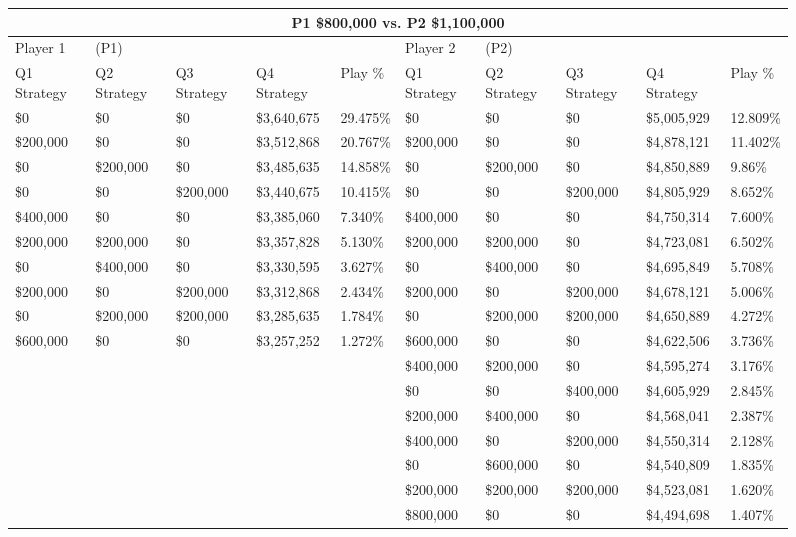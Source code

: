 \documentclass[11pt]{article}
\begin{document}
\begin{figure}
\tiny
\begin{tabular}{ |p{1.0cm}p{1.0cm}p{1.0cm}p{2.0cm}|p{1.0cm}||p{1.0cm}p{1.0cm}p{1.0cm}p{2.0cm}|p{1.0cm}|}
\hline
\multicolumn{10}{|c|}{P1 \$800,000 vs. P2 \$1,100,000} \\
\hline
Player 1 & (P1) & & & & Player 2 & (P2) & & & \\
\hline
Q1 Strategy & Q2 Strategy & Q3 Strategy & Q4 Strategy  &  Play \% & Q1 Strategy & Q2 Strategy & Q3 Strategy & Q4 Strategy  &  Play \%\\
\hline
\$0 & \$0 & \$0 & \$3,640,675 & 29.475\% & \$0 & \$0 & \$0 & \$5,005,929 & 12.809\% \\
\$200,000 & \$0 & \$0 & \$3,512,868 & 20.767\% & \$200,000 & \$0 & \$0 & \$4,878,121 & 11.402\% \\
\$0 & \$200,000 & \$0 & \$3,485,635 & 14.858\% & \$0 & \$200,000 & \$0 & \$4,850,889 & 9.86\% \\
\$0 & \$0 & \$200,000 & \$3,440,675 & 10.415\% & \$0 & \$0 & \$200,000 & \$4,805,929 & 8.652\% \\
\$400,000 & \$0 & \$0 & \$3,385,060 & 7.340\% & \$400,000 & \$0 & \$0 & \$4,750,314 & 7.600\% \\
\$200,000 & \$200,000 & \$0 & \$3,357,828 & 5.130\% & \$200,000 & \$200,000 & \$0 & \$4,723,081 & 6.502\% \\
\$0 & \$400,000 & \$0 & \$3,330,595 & 3.627\% & \$0 & \$400,000 & \$0 & \$4,695,849 & 5.708\% \\
\$200,000 & \$0 & \$200,000 & \$3,312,868 & 2.434\% & \$200,000 & \$0 & \$200,000 & \$4,678,121 & 5.006\% \\
\$0 & \$200,000 & \$200,000 & \$3,285,635 & 1.784\% & \$0 & \$200,000 & \$200,000 & \$4,650,889 & 4.272\% \\
\$600,000 & \$0 & \$0 & \$3,257,252 & 1.272\% & \$600,000 & \$0 & \$0 & \$4,622,506 & 3.736\% \\
&&&&&\$400,000 & \$200,000 & \$0 & \$4,595,274 & 3.176\% \\
&&&&&\$0 & \$0 & \$400,000 & \$4,605,929 & 2.845\% \\
&&&&&\$200,000 & \$400,000 & \$0 & \$4,568,041 & 2.387\% \\
&&&&&\$400,000 & \$0 & \$200,000 & \$4,550,314 & 2.128\% \\
&&&&&\$0 & \$600,000 & \$0 & \$4,540,809 & 1.835\% \\
&&&&&\$200,000 & \$200,000 & \$200,000 & \$4,523,081 & 1.620\% \\
&&&&&\$800,000 & \$0 & \$0 & \$4,494,698 & 1.407\% \\

\end{tabular}
\end{figure}
\end{document}

